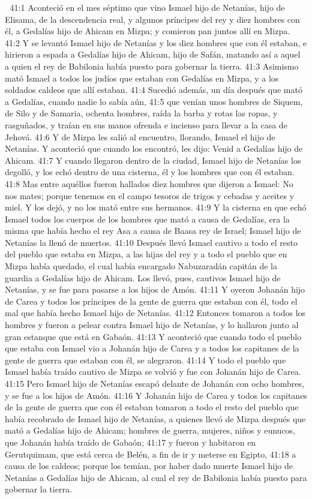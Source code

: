 
41:1 Aconteció en el mes séptimo que vino Ismael hijo de Netanías, hijo de Elisama, de la descendencia real, y algunos príncipes del rey y diez hombres con él, a Gedalías hijo de Ahicam en Mizpa; y comieron pan juntos allí en Mizpa.  
41:2 Y se levantó Ismael hijo de Netanías y los diez hombres que con él estaban, e hirieron a espada a Gedalías hijo de Ahicam, hijo de Safán, matando así a aquel a quien el rey de Babilonia había puesto para gobernar la tierra.  
41:3 Asimismo mató Ismael a todos los judíos que estaban con Gedalías en Mizpa, y a los soldados caldeos que allí estaban. 
41:4 Sucedió además, un día después que mató a Gedalías, cuando nadie lo sabía aún,  
41:5 que venían unos hombres de Siquem, de Silo y de Samaria, ochenta hombres, raída la barba y rotas las ropas, y rasguñados, y traían en sus manos ofrenda e incienso para llevar a la casa de Jehová.  
41:6 Y de Mizpa les salió al encuentro, llorando, Ismael el hijo de Netanías. Y aconteció que cuando los encontró, les dijo: Venid a Gedalías hijo de Ahicam.  
41:7 Y cuando llegaron dentro de la ciudad, Ismael hijo de Netanías los degolló, y los echó dentro de una cisterna, él y los hombres que con él estaban.  
41:8 Mas entre aquéllos fueron hallados diez hombres que dijeron a Ismael: No nos mates; porque tenemos en el campo tesoros de trigos y cebadas y aceites y miel. Y los dejó, y no los mató entre sus hermanos.  
41:9 Y la cisterna en que echó Ismael todos los cuerpos de los hombres que mató a causa de Gedalías, era la misma que había hecho el rey Asa a causa de Baasa rey de Israel; Ismael hijo de Netanías la llenó de muertos.  
41:10 Después llevó Ismael cautivo a todo el resto del pueblo que estaba en Mizpa, a las hijas del rey y a todo el pueblo que en Mizpa había quedado, el cual había encargado Nabuzaradán capitán de la guardia a Gedalías hijo de Ahicam. Los llevó, pues, cautivos Ismael hijo de Netanías, y se fue para pasarse a los hijos de Amón.  
41:11 Y oyeron Johanán hijo de Carea y todos los príncipes de la gente de guerra que estaban con él, todo el mal que había hecho Ismael hijo de Netanías.  
41:12 Entonces tomaron a todos los hombres y fueron a pelear contra Ismael hijo de Netanías, y lo hallaron junto al gran estanque que está en Gabaón.  
41:13 Y aconteció que cuando todo el pueblo que estaba con Ismael vio a Johanán hijo de Carea y a todos los capitanes de la gente de guerra que estaban con él, se alegraron.  
41:14 Y todo el pueblo que Ismael había traído cautivo de Mizpa se volvió y fue con Johanán hijo de Carea.  
41:15 Pero Ismael hijo de Netanías escapó delante de Johanán con ocho hombres, y se fue a los hijos de Amón.  
41:16 Y Johanán hijo de Carea y todos los capitanes de la gente de guerra que con él estaban tomaron a todo el resto del pueblo que había recobrado de Ismael hijo de Netanías, a quienes llevó de Mizpa después que mató a Gedalías hijo de Ahicam; hombres de guerra, mujeres, niños y eunucos, que Johanán había traído de Gabaón;  
41:17 y fueron y habitaron en Gerutquimam, que está cerca de Belén, a fin de ir y meterse en Egipto,  
41:18 a causa de los caldeos; porque los temían, por haber dado muerte Ismael hijo de Netanías a Gedalías hijo de Ahicam, al cual el rey de Babilonia había puesto para gobernar la tierra.  


